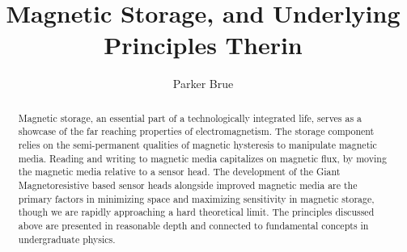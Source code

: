 \documentclass[11pt]{article}
\title{Magnetic Storage, and Underlying Principles Therin}
\author{Parker Brue}
\begin{document}
\maketitle

\begin{abstract}
Magnetic storage, an essential part of a technologically integrated life, serves as a showcase of the far reaching properties of electromagnetism. The storage component relies on the semi-permanent qualities of magnetic hysteresis to manipulate magnetic media. Reading and writing to magnetic media capitalizes on magnetic flux, by moving the magnetic media relative to a sensor head. The development of the Giant Magnetoresistive based sensor heads alongside improved magnetic media are the primary factors in minimizing space and maximizing sensitivity in magnetic storage, though we are rapidly approaching a hard theoretical limit.  The principles discussed above are presented in reasonable depth and connected to fundamental concepts in undergraduate physics.
\end{abstract}
\thispagestyle{fancy}
\end{document}
